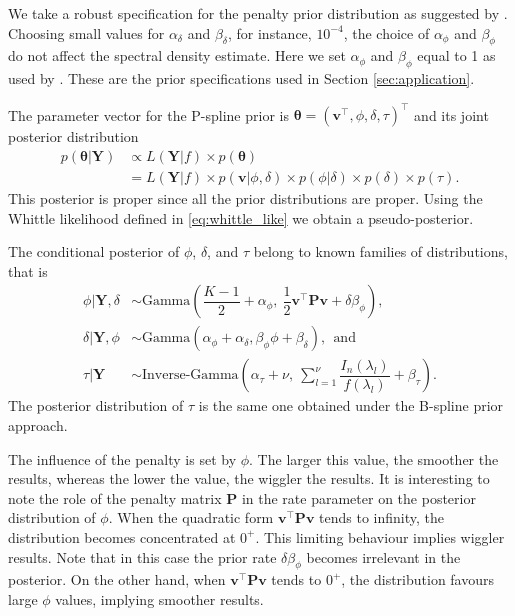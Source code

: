 \documentclass[aps,reprint,amsmath,amssymb,showpacs,showkeys]{revtex4-1}%
\begin{document}
We take a robust specification for the penalty prior distribution as suggested by \cite{Jullion:2007}.  Choosing small values for $\alpha_{\delta}$ and $\beta_{\delta}$, for instance, $10^{-4}$, the choice of $\alpha_{\phi}$ and $\beta_{\phi}$ do not affect the spectral density estimate. Here we set $\alpha_{\phi}$ and $\beta_{\phi}$ equal to 1 as used by \cite{Bremhorst:2016}.  These are the prior specifications used in Section \ref{sec:application}.

The parameter vector for the P-spline prior is $\bm{\theta} = (\bm{v}^\top, \phi, \delta, \tau)^\top$ and its joint posterior distribution
\begin{align*}
p(\bm{\theta}|\bm{Y}) & \propto L(\bm{Y}|f) \times p(\bm{\theta})  \\
&= L(\bm{Y}|f) \times p(\bm{v}|\phi, \delta) \times p(\phi|\delta) \times p(\delta) \times p(\tau).
\end{align*}
This posterior is proper since all the prior distributions are proper.  Using the Whittle likelihood defined in \eqref{eq:whittle_like} we obtain a pseudo-posterior.

The conditional posterior of $\phi$, $\delta$, and $\tau$ belong to known families of distributions, that is
\begin{align*}
\phi|\bm{Y},\delta &\sim \text{Gamma}\left(\dfrac{K-1}{2} + \alpha_{\phi},\: \dfrac{1}{2} \bm{v}^\top \textbf{P} \bm{v} + \delta \beta_{\phi} \right), \\
\delta|\bm{Y},\phi &\sim \text{Gamma}\left(\alpha_{\phi} + \alpha_{\delta}, \beta_{\phi} \phi + \beta_{\delta}\right),\:\: \text{and}\\
\tau|\bm{Y} &\sim \text{Inverse-Gamma}\left(\alpha_{\tau}+ \nu,\: \sum_{l=1}^{\nu} \dfrac{I_n(\lambda_l)}{f(\lambda_l)} + \beta_{\tau} \right).
\end{align*}
The posterior distribution of $\tau$ is the same one obtained under the B-spline prior approach.

The influence of the penalty is set by $\phi$.  The larger this value, the smoother the results, whereas the lower the value, the wiggler the results.  It is interesting to note the role of the penalty matrix  \textbf{P} in the rate parameter on the posterior distribution of $\phi$.  When the quadratic form $\bm{v}^\top \textbf{P} \bm{v}$ tends to infinity, the distribution becomes concentrated at $0^{+}$.  This limiting behaviour implies wiggler results.  Note that in this case the prior rate $\delta\beta_{\phi}$ becomes irrelevant in the posterior.  On the other hand, when $\bm{v}^\top \textbf{P} \bm{v}$ tends to $0^{+}$, the distribution favours large $\phi$ values, implying smoother results.  
\end{document}
